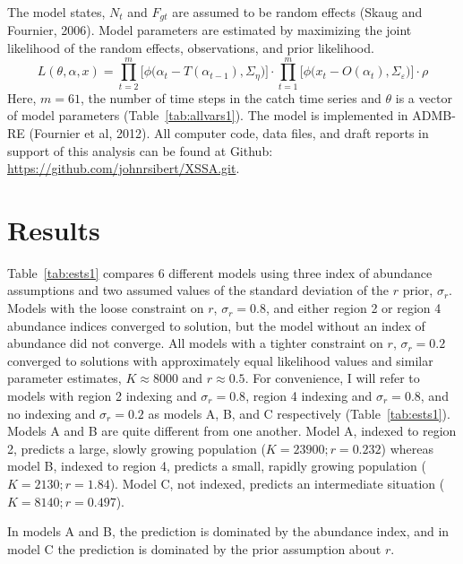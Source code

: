 \documentclass[12pt,letterpaper]{article}
\newcommand\doublespacing{\baselineskip=1.6\normalbaselineskip}
\begin{document}
The model states, $N_t$ and $F_{gt}$ are assumed to be random
effects (Skaug and Fournier, 2006). Model parameters are estimated by
maximizing the joint likelihood of the random
effects, observations, and prior likelihood.
\begin{equation}
\label{eqn:likelihood}
L(\theta,\alpha,x)=
\prod^m_{t=2}\big[\phi\big(\alpha_t-T(\alpha_{t-1}), \Sigma_\eta\big)\big]\cdot
\prod^m_{t=1}\big[\phi\big(x_t-O(\alpha_t),
\Sigma_\varepsilon\big)\big]\cdot\rho
\end{equation}
Here, $m=61$, the number of time steps in the catch time series and
$\theta$ is a vector of model parameters (Table~\ref{tab:allvars1}).
The model is implemented in ADMB-RE (Fournier et al, 2012).
All computer code, data files, and draft reports in support of this
analysis can be found at Github:
\url{https://github.com/johnrsibert/XSSA.git}.

\doublespacing

\section*{Results}
Table~\ref{tab:ests1} compares 6 different models
using three index of abundance assumptions and two 
assumed values of the standard deviation of the $r$ prior, $\sigma_r$. 
Models with the loose constraint on $r$, $\sigma_r=0.8$, and either
region 2 or region 4 abundance indices converged to solution, but the
model without an index of abundance did not converge.
All models with a tighter constraint on $r$, $\sigma_r=0.2$ converged
to solutions with approximately equal likelihood values and similar
parameter estimates, $K\approx 8000$ and $r\approx 0.5$.
For convenience, I will refer to models with 
region 2 indexing and $\sigma_r=0.8$,
region 4 indexing and $\sigma_r=0.8$, and 
no indexing and $\sigma_r=0.2$
as models A, B, and C respectively (Table~\ref{tab:ests1}).
Models A and B are quite different from one another. 
Model A, indexed to region 2, 
predicts a large, slowly growing population ($K=23900; r=0.232$)
whereas model B, indexed to region 4, predicts a small, rapidly growing
population ($K = 2130; r=1.84$).
Model C, not indexed, predicts an intermediate situation ($K=8140; r=0.497$). 

In models A and B, the prediction is dominated by
the abundance index, and in model C the prediction is dominated by the
prior assumption about $r$.
\end{document}

